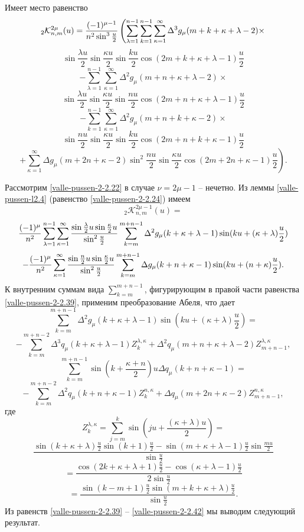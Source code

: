 \begin{lemma}\label{valle-pussen-l2.5}
Имеет место равенство
$$
_2\mathcal{ K}_{n,m}^{2\mu}(u)={(-1)^{\mu-1}\over n^2\sin^3\frac{u}{2}}\left(\sum\limits_{\lambda=1}^{n-1}\sum_{k=1}^{n-1}
\sum\limits_{\kappa=1}^{\infty}\Delta^3g_\mu(m+k+\kappa+\lambda-2)\times\right.
$$
$$
\sin\frac{\lambda u}{2}\sin\frac{\kappa u}{2}\sin\frac{ku}{2}\cos(2m+k+\kappa+\lambda-1)\frac{u}{2}
$$
$$
 -\sum\limits_{\lambda=1}^{n-1}
\sum\limits_{\kappa=1}^{\infty}\Delta^2g_\mu(m+n+\kappa+\lambda-2)\times
$$
$$
\sin\frac{\lambda u}{2}\sin\frac{\kappa u}{2}\sin\frac{nu}{2}\cos(2m+n+\kappa+\lambda-1)\frac{u}{2}
$$
$$
 -\sum_{k=1}^{n-1}
\sum\limits_{\kappa=1}^{\infty}\Delta^2g_\mu(m+n+k+\kappa-2)\times
$$
$$
\sin\frac{nu}{2}\sin\frac{\kappa u}{2}\sin\frac{ku}{2}\cos(2m+n+k+\kappa-1)\frac{u}{2}
$$
$$
 \left.+\sum\limits_{\kappa=1}^{\infty}\Delta g_\mu(m+2n+\kappa-2)
\sin^2\frac{nu}{2}\sin\frac{\kappa u}{2}\cos(2m+2n+\kappa-1)\frac{u}{2}\right).
$$
\end{lemma}
Рассмотрим \eqref{valle-pussen-2-2.22} в случае $\nu=2\mu-1$ --  нечетно. Из леммы \ref{valle-pussen-l2.4} (равенство \eqref{valle-pussen-2-2.24}) имеем
$$
 _2\mathcal{ K}_{n,m}^{2\mu-1}(u)=
 $$
 $$
 {(-1)^\mu\over n^2}\sum\limits_{\lambda=1}^{n-1}
\sum\limits_{\kappa=1}^{\infty}\frac{\sin\frac{\lambda}{2}u\sin\frac{\kappa}{2}u}
{\sin^2\frac u2}
\sum_{k=m}^{m+n-1}\Delta^2g_\mu(k+\kappa+\lambda-1)\sin(ku+(\kappa+\lambda)\frac{u}{2})
$$
 \begin{equation}\label{valle-pussen-2-2.39}
    -{(-1)^{\mu}\over n^2}\sum\limits_{\kappa=1}^{\infty}
\frac{\sin\frac {n}{2}u\sin\frac{\kappa}{2}u}{\sin^2\frac u2}
\sum_{k=m}^{m+n-1}\Delta g_\mu(k+n+\kappa-1)\sin(ku+(n+\kappa)\frac{u}{2}).
 \end{equation}
К внутренним суммам вида $\sum_{k=m}^{m+n-1}$, фигурирующим в правой части равенства \eqref{valle-pussen-2-2.39}, применим преобразование Абеля, что дает
 $$
 \sum_{k=m}^{m+n-1}\Delta^2g_\mu(k+\kappa+\lambda-1)\sin(ku+(\kappa+\lambda)\frac{u}{2})=
 $$
 \begin{equation}\label{valle-pussen-2-2.40}
-\sum_{k=m}^{m+n-2}\Delta^3q_\mu(k+\kappa+\lambda-1)Z_k^{\lambda,\kappa}
+\Delta^2q_\mu(m+n+\kappa+\lambda-2)Z_{m+n-1}^{\lambda,\kappa},
\end{equation}
$$
\sum_{k=m}^{m+n-1}\sin(k+\frac{\kappa+n}{2})u\Delta q_\mu(k+n+\kappa-1)=
$$
 \begin{equation}\label{valle-pussen-2-2.41}
-\sum_{k=m}^{m+n-2}\Delta^2q_\mu(k+n+\kappa-1)Z_k^{n,\kappa}
+\Delta q_\mu(m+2n+\kappa-2)Z_{m+n-1}^{n,\kappa},
    \end{equation}
где
$$
Z_k^{\lambda,\kappa}=\sum_{j=m}^k \sin(ju+\frac{(\kappa+\lambda)u}{2})=
$$
$$
\frac{\sin(k+\kappa+\lambda)\frac{u}{2}\sin(k+1)\frac{u}{2}-
\sin(m+\kappa+\lambda-1)\frac{u}{2}\sin\frac{mu}{2}}{\sin\frac{u}{2}}
$$
$$
=\frac{\cos(2k+\kappa+\lambda+1)\frac{u}{2}-\cos(\kappa+\lambda-1)\frac{u}{2}}{2\sin\frac{u}{2}}
$$
 \begin{equation}\label{valle-pussen-2-2.42}
=\frac{\sin(k-m+1)\frac{u}{2}\sin(m+k+\kappa+\lambda)\frac{u}{2}}{\sin\frac{u}{2}}.
    \end{equation}
Из равенств \eqref{valle-pussen-2-2.39} -- \eqref{valle-pussen-2-2.42} мы выводим следующий результат.

